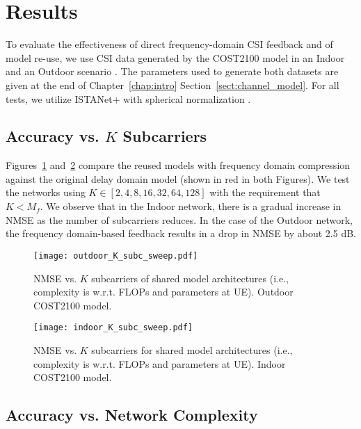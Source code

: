 \section{Results} \label{sect:direct_reuse_results}

To evaluate the effectiveness of direct frequency-domain CSI feedback and of model re-use, we use CSI data generated by the COST2100 model in an Indoor and an Outdoor scenario \cite{ref:liu2012cost2100}. The parameters used to generate both datasets are given at the end of Chapter~\ref{chap:intro} Section~\ref{sect:channel_model}. For all tests, we utilize ISTANet+ with spherical normalization \cite{ref:liu2020sphnet}.%

\subsection{Accuracy vs. $K$ Subcarriers} \label{sect:acc_vs_k}

Figures~\ref{fig:outdoor_nmse_vs_K} and~\ref{fig:indoor_nmse_vs_K} compare the reused models with frequency domain compression against the original delay domain model (shown in {\color{red}red} in both Figures). We test the networks using $K\in [2,4,8,16,32,64,128]$ with the requirement that $K < M_f$. We observe that in the Indoor network, there is a gradual increase in NMSE as the number of subcarriers reduces. In the case of the Outdoor network, the frequency domain-based feedback results in a drop in NMSE by about 2.5 dB.

\begin{figure}[!hbtp]
    \centering
    \texttt{[image: outdoor\_K\_subc\_sweep.pdf]}
    \caption{NMSE vs. $K$ subcarriers of shared model architectures (i.e., complexity is w.r.t. FLOPs and parameters at UE). Outdoor COST2100 model.}
    \label{fig:outdoor_nmse_vs_K}
\end{figure}

\begin{figure}[!hbtp]
    \centering
    \texttt{[image: indoor\_K\_subc\_sweep.pdf]}
    \caption{NMSE vs. $K$ subcarriers for shared model architectures (i.e., complexity is w.r.t. FLOPs and parameters at UE). Indoor COST2100 model.}
    \label{fig:indoor_nmse_vs_K}
\end{figure}

\subsection{Accuracy vs. Network Complexity} \label{sect:acc_vs_comp}

